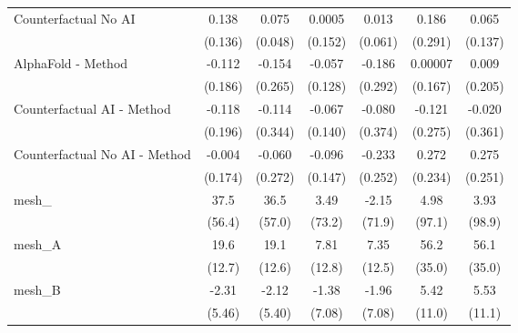 \begin{tabular}{lcccccc}
   Counterfactual No AI                                        & 0.138         & 0.075         & 0.0005         & 0.013         & 0.186         & 0.065\\   
                                                               & (0.136)       & (0.048)       & (0.152)        & (0.061)       & (0.291)       & (0.137)\\   
   AlphaFold - Method                                          & -0.112        & -0.154        & -0.057         & -0.186        & 0.00007       & 0.009\\   
                                                               & (0.186)       & (0.265)       & (0.128)        & (0.292)       & (0.167)       & (0.205)\\   
   Counterfactual AI - Method                                  & -0.118        & -0.114        & -0.067         & -0.080        & -0.121        & -0.020\\   
                                                               & (0.196)       & (0.344)       & (0.140)        & (0.374)       & (0.275)       & (0.361)\\   
   Counterfactual No AI - Method                               & -0.004        & -0.060        & -0.096         & -0.233        & 0.272         & 0.275\\   
                                                               & (0.174)       & (0.272)       & (0.147)        & (0.252)       & (0.234)       & (0.251)\\   
   mesh\_                                                      & 37.5          & 36.5          & 3.49           & -2.15         & 4.98          & 3.93\\   
                                                               & (56.4)        & (57.0)        & (73.2)         & (71.9)        & (97.1)        & (98.9)\\   
   mesh\_A                                                     & 19.6          & 19.1          & 7.81           & 7.35          & 56.2          & 56.1\\   
                                                               & (12.7)        & (12.6)        & (12.8)         & (12.5)        & (35.0)        & (35.0)\\   
   mesh\_B                                                     & -2.31         & -2.12         & -1.38          & -1.96         & 5.42          & 5.53\\   
                                                               & (5.46)        & (5.40)        & (7.08)         & (7.08)        & (11.0)        & (11.1)\\   

\end{tabular}
